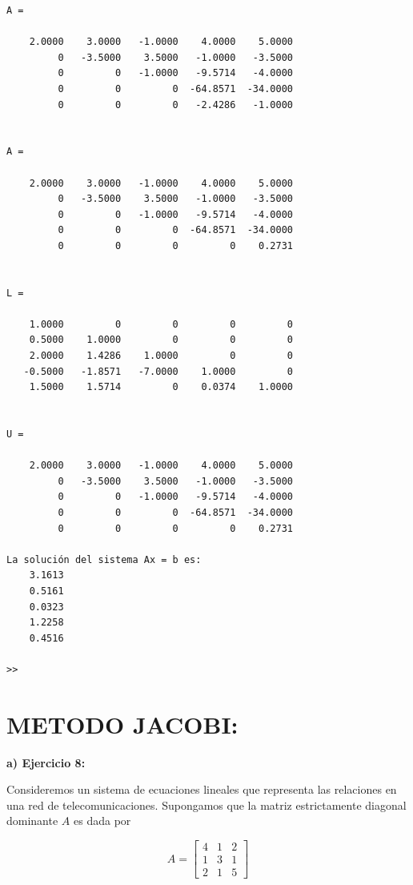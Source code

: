 \documentclass[12pt,a4paper,twoside]{article}  %
\begin{document}
\begin{verbatim}
A =

    2.0000    3.0000   -1.0000    4.0000    5.0000
         0   -3.5000    3.5000   -1.0000   -3.5000
         0         0   -1.0000   -9.5714   -4.0000
         0         0         0  -64.8571  -34.0000
         0         0         0   -2.4286   -1.0000


A =

    2.0000    3.0000   -1.0000    4.0000    5.0000
         0   -3.5000    3.5000   -1.0000   -3.5000
         0         0   -1.0000   -9.5714   -4.0000
         0         0         0  -64.8571  -34.0000
         0         0         0         0    0.2731


L =

    1.0000         0         0         0         0
    0.5000    1.0000         0         0         0
    2.0000    1.4286    1.0000         0         0
   -0.5000   -1.8571   -7.0000    1.0000         0
    1.5000    1.5714         0    0.0374    1.0000


U =

    2.0000    3.0000   -1.0000    4.0000    5.0000
         0   -3.5000    3.5000   -1.0000   -3.5000
         0         0   -1.0000   -9.5714   -4.0000
         0         0         0  -64.8571  -34.0000
         0         0         0         0    0.2731

La solución del sistema Ax = b es:
    3.1613
    0.5161
    0.0323
    1.2258
    0.4516

>> 

\end{verbatim}




\section{METODO JACOBI:}

\textbf{a) Ejercicio 8: }

Consideremos un sistema de ecuaciones lineales que representa las relaciones en una red de telecomunicaciones. Supongamos que la matriz estrictamente diagonal dominante \( A \) es dada por 

\[
A = \begin{bmatrix}
4 & 1 & 2 \\
1 & 3 & 1 \\
2 & 1 & 5
\end{bmatrix}
\]
\end{document}
